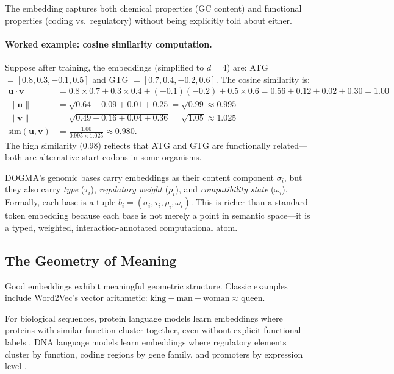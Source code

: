 The embedding captures both chemical properties (GC content) and functional properties (coding vs.\ regulatory) without being explicitly told about either.

\paragraph{Worked example: cosine similarity computation.} Suppose after training, the embeddings (simplified to $d = 4$) are: ATG $= [0.8, 0.3, -0.1, 0.5]$ and GTG $= [0.7, 0.4, -0.2, 0.6]$. The cosine similarity is:
\begin{align}
\mathbf{u} \cdot \mathbf{v} &= 0.8 \times 0.7 + 0.3 \times 0.4 + (-0.1)(-0.2) + 0.5 \times 0.6 = 0.56 + 0.12 + 0.02 + 0.30 = 1.00 \\
\|\mathbf{u}\| &= \sqrt{0.64 + 0.09 + 0.01 + 0.25} = \sqrt{0.99} \approx 0.995 \\
\|\mathbf{v}\| &= \sqrt{0.49 + 0.16 + 0.04 + 0.36} = \sqrt{1.05} \approx 1.025 \\
\text{sim}(\mathbf{u}, \mathbf{v}) &= \frac{1.00}{0.995 \times 1.025} \approx 0.980.
\end{align}
The high similarity ($0.98$) reflects that ATG and GTG are functionally related---both are alternative start codons in some organisms.

\begin{keyinsight}
DOGMA's genomic bases carry embeddings as their content component $\sigma_i$, but they also carry \emph{type} ($\tau_i$), \emph{regulatory weight} ($\rho_i$), and \emph{compatibility state} ($\omega_i$). Formally, each base is a tuple $b_i = (\sigma_i, \tau_i, \rho_i, \omega_i)$. This is richer than a standard token embedding because each base is not merely a point in semantic space---it is a typed, weighted, interaction-annotated computational atom.
\end{keyinsight}

\subsection{The Geometry of Meaning}

Good embeddings exhibit meaningful geometric structure. Classic examples include Word2Vec's vector arithmetic: $\text{king} - \text{man} + \text{woman} \approx \text{queen}$.

For biological sequences, protein language models learn embeddings where proteins with similar function cluster together, even without explicit functional labels \citep{lin2023}. DNA language models learn embeddings where regulatory elements cluster by function, coding regions by gene family, and promoters by expression level \citep{ji2021dnabert}.


